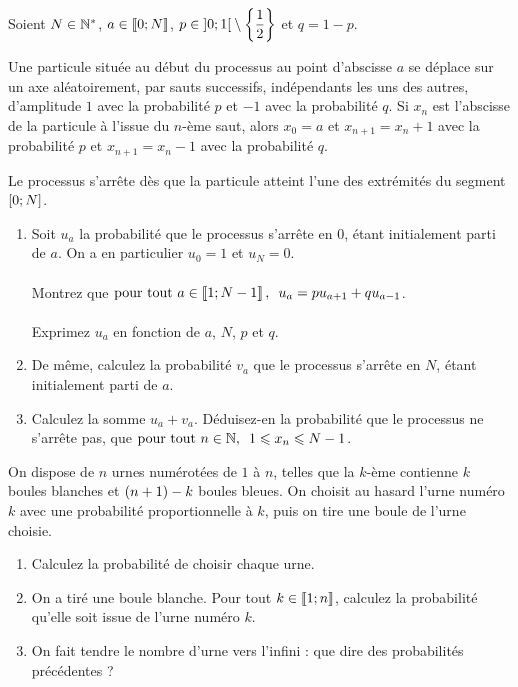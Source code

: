 \begin{exoss}
Soient \(N\in\mathbb{N}^*\), \(a\in\left\llbracket0;N\right\rrbracket\), \(p\in\left]0;1\right[\setminus\left\lbrace\dfrac{1}{2}\right\rbrace\) et \(q=1-p\).

Une particule située au début du processus au point d'abscisse \(a\) se déplace sur un axe aléatoirement, par sauts successifs, indépendants les uns des autres, d'amplitude \(1\) avec la probabilité \(p\) et \(-1\) avec la probabilité \(q\). Si \(x_n\) est l'abscisse de la particule à l'issue du \(n\)-ème saut, alors \(x_0=a\) et \(x_{n+1}=x_n+1\) avec la probabilité \(p\) et \(x_{n+1}=x_n-1\) avec la probabilité \(q\).

Le processus s'arrête dès que la particule atteint l'une des extrémités du segment \(\left[0;N\right]\).

\begin{enumerate}
    \item Soit \(u_a\) la probabilité que le processus s'arrête en \(0\), étant initialement parti de \(a\). On a en particulier \(u_0=1\) et \(u_N=0\). \\\\ Montrez que \(\quantifs{\tpt a\in\interventierii{1}{N-1}}u_a=pu_{a+1}+qu_{a-1}\). \\\\ Exprimez \(u_a\) en fonction de \(a\), \(N\), \(p\) et \(q\). \\
    \item De même, calculez la probabilité \(v_a\) que le processus s'arrête en \(N\), étant initialement parti de \(a\). \\
    \item Calculez la somme \(u_a+v_a\). Déduisez-en la probabilité que le processus ne s'arrête pas, \cad que \(\quantifs{\tpt n\in\N}1\leq x_n\leq N-1\).
\end{enumerate}
\end{exoss}

\begin{exoss}
On dispose de \(n\) urnes numérotées de \(1\) à \(n\), telles que la \(k\)-ème contienne \(k\) boules blanches et \(\left(n+1\right)-k\) boules bleues. On choisit au hasard l'urne numéro \(k\) avec une probabilité proportionnelle à \(k\), puis on tire une boule de l'urne choisie.

\begin{enumerate}
    \item Calculez la probabilité de choisir chaque urne. \\
    \item On a tiré une boule blanche. Pour tout \(k\in\left\llbracket1;n\right\rrbracket\), calculez la probabilité qu'elle soit issue de l'urne numéro \(k\). \\
    \item On fait tendre le nombre d'urne vers l'infini : que dire des probabilités précédentes ?
\end{enumerate}
\end{exoss}

